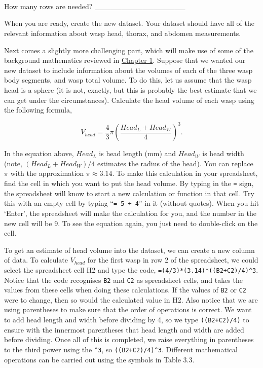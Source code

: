 \documentclass[
  openany]{krantz}
\begin{document}
\begin{verbatim}




\end{verbatim}

How many rows are needed? \_\_\_\_\_\_\_\_\_\_\_\_\_\_\_\_\_

When you are ready, create the new dataset.
Your dataset should have all of the relevant information about wasp head, thorax, and abdomen measurements.

Next comes a slightly more challenging part, which will make use of some of the background mathematics reviewed in \protect\hyperlink{Chapter_1}{Chapter 1}.
Suppose that we wanted our new dataset to include information about the volumes of each of the three wasp body segments, and wasp total volume.
To do this, let us assume that the wasp head is a sphere (it is not, exactly, but this is probably the best estimate that we can get under the circumstances).
Calculate the head volume of each wasp using the following formula,

\[V_{head} = \frac{4}{3}\pi \left(\frac{Head_L + Head_W}{4}\right)^{3}.\]

In the equation above, \(Head_{L}\) is head length (mm) and \(Head_{W}\) is head width (note, \((Head_L + Head_W)/4\) estimates the radius of the head).
You can replace \(\pi\) with the approximation \(\pi \approx 3.14\).
To make this calculation in your spreadsheet, find the cell in which you want to put the head volume.
By typing in the \texttt{=} sign, the spreadsheet will know to start a new calculation or function in that cell.
Try this with an empty cell by typing ``\texttt{=\ 5\ +\ 4}'' in it (without quotes).
When you hit `Enter', the spreadsheet will make the calculation for you, and the number in the new cell will be 9.
To see the equation again, you just need to double-click on the cell.

To get an estimate of head volume into the dataset, we can create a new column of data.
To calculate \(V_{head}\) for the first wasp in row 2 of the spreadsheet, we could select the spreadsheet cell H2 and type the code, \texttt{=(4/3)*(3.14)*((B2+C2)/4)\^{}3}.
Notice that the code recognises \texttt{B2} and \texttt{C2} as spreadsheet cells, and takes the values from these cells when doing these calculations.
If the values of \texttt{B2} or \texttt{C2} were to change, then so would the calculated value in H2.
Also notice that we are using parentheses to make sure that the order of operations is correct.
We want to add head length and width before dividing by 4, so we type \texttt{((B2+C2)/4)} to ensure with the innermost parentheses that head length and width are added before dividing.
Once all of this is completed, we raise everything in parentheses to the third power using the \texttt{\^{}3}, so \texttt{((B2+C2)/4)\^{}3}.
Different mathematical operations can be carried out using the symbols in Table 3.3.
\end{document}
